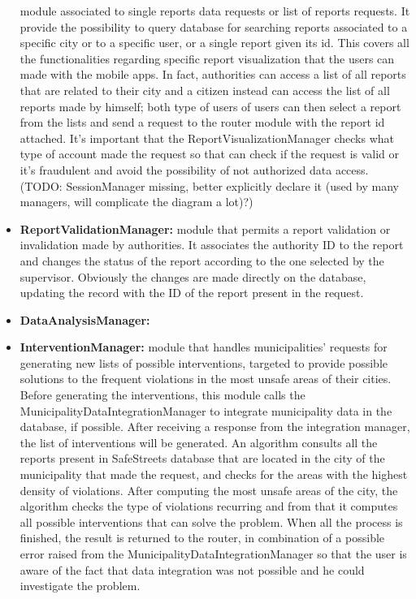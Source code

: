 \begin{itemize}
	module associated to single reports data requests or list of reports requests. It provide the possibility to query database for searching reports associated to a specific city or to a specific user, or a single report given its id. This covers all the functionalities regarding specific report visualization that the users can made with the mobile apps. In fact, authorities can access a list of all reports that are related to their city and a citizen instead can access the list of all reports made by himself; both type of users of users can then select a report from the lists and send a request to the router module with the report id attached. It's important that the ReportVisualizationManager checks what type of account made the request so that can check if the request is valid or it's fraudulent and avoid the possibility of not authorized data access. (TODO: SessionManager missing, better explicitly declare it (used by many managers, will complicate the diagram a lot)?)  
	\item \textbf{ReportValidationManager:}
	module that permits a report validation or invalidation made by authorities. It associates the authority ID to the report and changes the status of the report according to the one selected by the supervisor. Obviously the changes are made directly on the database, updating the record with the ID of the report present in the request.
	\item \textbf{DataAnalysisManager:}
	\item \textbf{InterventionManager:}
	module that handles municipalities' requests for generating new lists of possible interventions, targeted to provide possible solutions to the frequent violations in the most unsafe areas of their cities. Before generating the interventions, this module calls the MunicipalityDataIntegrationManager to integrate municipality data in the database, if possible. After receiving a response from the integration manager, the list of interventions will be generated. An algorithm consults all the reports present in SafeStreets database that are located in the city of the municipality that made the request, and checks for the areas with the highest density of violations. After computing the most unsafe areas of the city, the algorithm checks the type of violations recurring and from that it computes all possible interventions that can solve the problem. When all the process is finished, the result is returned to the router, in combination of a possible error raised from the MunicipalityDataIntegrationManager so that the user is aware of the fact that data integration was not possible and he could investigate the problem.

\end{itemize}
